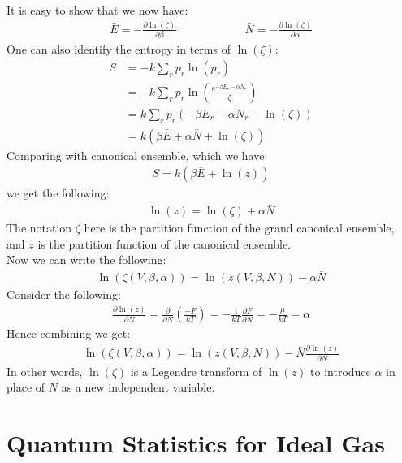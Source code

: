 \documentclass[11pt,oneside]{book}
\theoremstyle{break}
\theoremstyle{break}
\begin{document}
It is easy to show that we now have:
\begin{align*}
\bar{E} = -\frac{\partial \ln (\zeta)}{\partial \beta} \qquad\qquad\qquad \bar{N} = -\frac{\partial \ln(\zeta)}{\partial \alpha}
\end{align*}
One can also identify the entropy in terms of $\ln(\zeta)$:
\begin{align*}
S &= -k \sum_r p_r \ln (p_r)\\
&=-k \sum_r p_r \ln\left( \frac{e^{-\beta E_r - \alpha N_r}}{\zeta}\right)
\\ 
&= k\sum_r p_r \left( -\beta E_r - \alpha N_r -\ln (\zeta)\right)\\
&=k(\beta \bar{E} +\alpha \bar{N} + \ln(\zeta)) 
\end{align*}
Comparing with canonical ensemble, which we have:
\begin{align*}
S = k(\beta \bar{E} + \ln(z))
\end{align*}
we get the following:
\begin{align*}
\ln(z) = \ln(\zeta) + \alpha \bar{N}
\end{align*}
The notation $\zeta$ here is the partition function of the grand canonical ensemble, and $z$ is the partition function of the canonical ensemble.\\

Now we can write the following:
\begin{align*}
\ln(\zeta(V,\beta, \alpha)) = \ln (z(V,\beta, N)) - \alpha \bar{N}
\end{align*}
Consider the following:
\begin{align*}
\frac{\partial \ln(z)}{\partial N} = \frac{\partial }{\partial N}\left( \frac{-F}{kT}\right) = -\frac{1}{kT} \frac{\partial F}{\partial N} = -\frac{\mu}{kT} = \alpha
\end{align*}
Hence combining we get:
\begin{align*}
\ln(\zeta(V,\beta,\alpha)) = \ln(z(V,\beta, N)) - \bar{N} \frac{\partial \ln(z)}{\partial N}
\end{align*}
In other words, $\ln(\zeta)$ is a Legendre transform of $\ln(z)$ to introduce $\alpha$ in place of $N$ as a new independent variable.\\

\newpage
\chapter{ Quantum Statistics for Ideal Gas}
\end{document}
